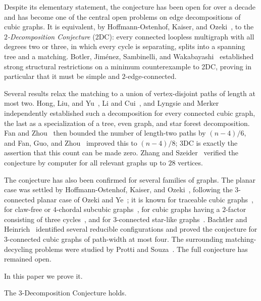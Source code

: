 \documentclass[a4paper,11pt]{article}
\numberwithin{equation}{section}
\begin{document}
Despite its elementary statement, the conjecture has been open for over a decade and has
become one of the central open problems on edge decompositions of cubic graphs.
It is equivalent, by Hoffmann-Ostenhof, Kaiser, and
Ozeki~\cite{HoffmannOstenhofKaiserOzeki2018}, to the \emph{$2$-Decomposition
Conjecture} (2DC): every connected loopless multigraph with all degrees two or
three, in which every cycle is separating, splits into a spanning tree and a
matching. Botler, Jim\'enez, Sambinelli, and
Wakabayashi~\cite{BotlerJimenezSambinelliWakabayashi2024} established strong
structural restrictions on a minimum counterexample to 2DC, proving in particular
that it must be simple and $2$-edge-connected.

Several results relax the matching to a union of vertex-disjoint paths of length
at most two. Hong, Liu, and Yu~\cite{HongLiuYu2020}, Li and
Cui~\cite{LiCui2014}, and Lyngsie and Merker~\cite{LyngsieMerker2019}
independently established such a decomposition for every connected cubic graph,
the last as a specialization of a tree, even graph, and star forest
decomposition. Fan and Zhou~\cite{FanZhou2025} then bounded the number of
length-two paths by $(n-4)/6$, and Fan, Guo, and Zhou~\cite{FanGuoZhou2026}
improved this to $(n-4)/8$; 3DC is exactly the assertion that this count can be
made zero. Zhang and Szeider~\cite{ZhangSzeider2025} verified the conjecture by
computer for all relevant graphs up to $28$ vertices.

The conjecture has also been confirmed for several families of graphs. The
planar case was settled by Hoffmann-Ostenhof, Kaiser, and
Ozeki~\cite{HoffmannOstenhofKaiserOzeki2018}, following the $3$-connected planar
case of Ozeki and Ye~\cite{OzekiYe2016}; it is known for traceable cubic
graphs~\cite{AbdolhosseiniAkbariHashemiMoradian2016, LiuLi2020}, for claw-free
or $4$-chordal subcubic graphs~\cite{AboomahigirAhanjidehAkbari2018}, for cubic
graphs having a $2$-factor consisting of three cycles~\cite{XieZhouZhou2020},
and for $3$-connected star-like graphs~\cite{BachtlerKrumke2022}. Bachtler and
Heinrich~\cite{BachtlerHeinrich2023} identified several reducible configurations
and proved the conjecture for $3$-connected cubic graphs of path-width at most
four. The surrounding matching-decycling problems were studied by Protti and
Souza~\cite{ProttiSouza2018}. The full conjecture has remained open.

In this paper we prove it.

\begin{theorem}\label{thm:3dc-resolved}
  The $3$-Decomposition Conjecture holds.
\end{theorem}
\end{document}
